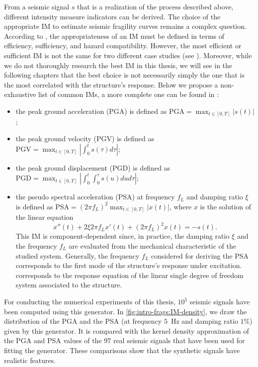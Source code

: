 From a seismic signal $s$ that is a realization of the process described above, different intensity measure  indicators can be derived.
The choice of the appropriate IM to estimate seismic fragility curves
remains a complex question. 
According to \citet{giovenale_comparing_2004}, the appropriateness of an IM must be defined in terms of efficiency, sufficiency, and hazard compatibility.
However, the most efficient or sufficient IM is not the same for two different case studies (see \cite{mackie_probabilistic_2001,hariri-ardebili_probabilistic_2016}). %
Moreover, while we do not  thoroughly research the best IM in this thesis, we will see in the following chapters that the best choice is not necessarily simply the one that is the most correlated with the structure's response.
Below we propose a non-exhaustive list of common IMs, a more complete one can be found in \cite{luco_structure-specific_2007}:
    \begin{itemize}
        \item the peak ground acceleration (PGA) is defined as $\text{PGA}=\max_{t\in[0,T]}|s(t)|$;
        \item the peak ground velocity (PGV) is defined as $\text{PGV}=\max_{t\in[0,T]}\left|\int_0^ts(\tau)d\tau \right|$;
        \item the peak ground displacement (PGD) is defined as $\text{PGD}=\max_{t\in[0,T]}\left|\int_{0}^{t}\int_{0}^{\tau}s(u)dud\tau\right|$;
        \item the pseudo spectral acceleration (PSA) at frequency $f_L$ and damping ratio $\xi$ is defined as $\text{PSA}=(2\pi f_L)^2\max_{t\in[0,T]}|x(t)|$, where $x$ is the solution of the linear equation
        \begin{equation}\label{eq:intro-frag:ALS}
            x''(t) + 2\xi2\pi f_Lx'(t)+(2\pi f_L)^2x(t) = -s(t).
        \end{equation}
        This IM is component-dependent since, in practice, the damping ratio $\xi$ and the frequency $f_L$ are evaluated from the mechanical characteristic of the studied system. Generally, the frequency $f_L$ considered for deriving the PSA corresponds to the first mode of the structure's response under excitation.  corresponds to the response equation of the linear single degree of freedom system associated to the structure.
    \end{itemize}

For  conducting the numerical experiments of this thesis, $10^5$ seismic signals have been computed using this generator.
In \cref{fig:intro-frags:IM-density}, we draw the distribution of the PGA and the PSA (at frequency $5$~Hz and damping ratio $1\%$) given by this generator. It is compared with the kernel density approximation of the PGA and PSA values of the $97$ real seismic signals that have been used for fitting the generator. %
These comparisons show that the synthetic signals have realistic features.

